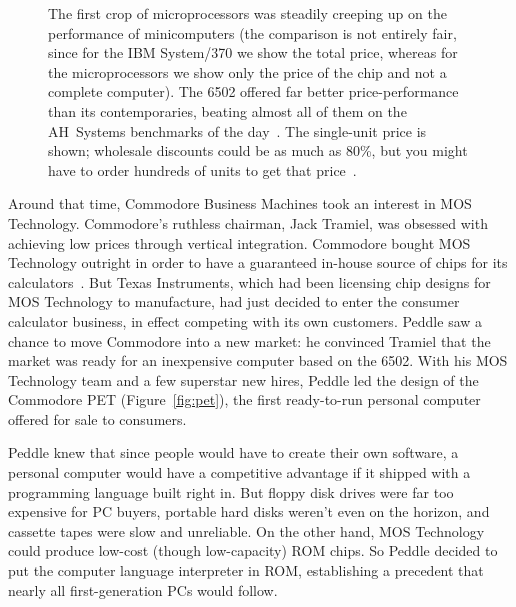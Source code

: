 \begin{figure}
  
  \caption{\label{fig:price_performance} 
    The first crop of microprocessors was steadily creeping up on the
    performance of minicomputers (the comparison is not entirely fair,
    since for the IBM System/370 we show the total price, whereas for
    the microprocessors we show only the price of the chip and not a
    complete computer).
    The 6502 offered far better
    price-performance than its contemporaries,
    beating almost all of them on the AH~Systems benchmarks of
    the day~\cite{edn75:6502}.  
    The single-unit price is shown; wholesale discounts could be
    as much as 80\%, but you might have to order hundreds of units to
    get that price~\cite[p. 228]{ceruzzi}.}
\end{figure}



Around that time, Commodore Business Machines took an interest in MOS
Technology.  Commodore's ruthless chairman,
Jack Tramiel, was 
obsessed with achieving low prices through vertical integration.
Commodore bought
MOS Technology outright in order to have a guaranteed in-house source of
chips for its calculators~\cite{commodore}.
But Texas Instruments, which had been licensing chip designs for MOS
Technology to manufacture, had just decided
to enter the consumer calculator business, in effect competing with its own
customers. 
Peddle saw a chance to move Commodore into a new market: he convinced
Tramiel that the market was ready for an inexpensive computer
based on the 6502.
With his MOS Technology team and a few superstar
new hires, Peddle led the design of the Commodore PET (Figure~\ref{fig:pet}), 
the first ready-to-run personal computer offered for sale to consumers.

Peddle knew that since people would have to create their own software, a
personal computer would have a competitive advantage if it shipped with
a programming language built right in.
But floppy disk drives were far too expensive for PC buyers, portable
hard disks weren't even on the horizon, and cassette tapes were slow and
unreliable.  On the other hand, MOS Technology could produce low-cost
(though low-capacity) ROM 
chips.  So Peddle decided to  put the computer language interpreter in ROM, establishing
a precedent that nearly all first-generation PCs would follow.

